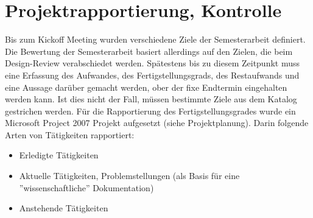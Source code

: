 \chapter{Projektrapportierung, Kontrolle}
Bis zum Kickoff Meeting wurden verschiedene Ziele der Semesterarbeit definiert. Die Bewertung der Semesterarbeit basiert allerdings auf den Zielen, die beim Design-Review verabschiedet werden. Sp\"atestens bis zu diesem Zeitpunkt muss eine Erfassung des Aufwandes, des Fertigstellungsgrads, des Restaufwands und eine Aussage dar\"uber gemacht werden, ober der fixe Endtermin eingehalten werden kann. Ist dies nicht der Fall, m\"ussen bestimmte Ziele aus dem Katalog gestrichen werden.\newline
F\"ur die Rapportierung des Fertigstellungsgrades wurde ein Microsoft Project 2007 Projekt aufgesetzt (siehe Projektplanung). Darin folgende Arten von T\"atigkeiten rapportiert:

\begin{itemize}
\item Erledigte T\"atigkeiten
\item Aktuelle T\"atigkeiten, Problemstellungen (als Basis f\"ur eine ''wissenschaftliche'' Dokumentation)
\item Anstehende T\"atigkeiten
\end{itemize}